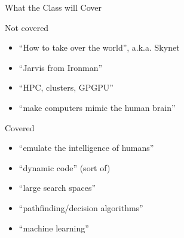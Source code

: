 \documentclass[14pt]{beamer}
\begin{document}
\begin{frame}{What the Class will Cover}
\begin{block}{Not covered}
\begin{itemize}
\item ``How to take over the world'', a.k.a. Skynet
\item ``Jarvis from Ironman''
\item ``HPC, clusters, GPGPU''
\item ``make computers mimic the human brain''
\end{itemize}
\end{block}
\begin{block}{Covered}
\begin{itemize}
\item ``emulate the intelligence of humans''
\item ``dynamic code'' (sort of)
\item ``large search spaces''
\item ``pathfinding/decision algorithms''
\item ``machine learning''
\end{itemize}
\end{block}
\end{frame}
\end{document}
